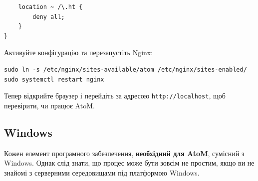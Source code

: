 \documentclass[14pt,a4paper]{article}
\begin{document}
\begin{large}
\begin{lstlisting}
    location ~ /\.ht {
        deny all;
    }
}
\end{lstlisting}

Активуйте конфігурацію та перезапустіть Nginx:

\begin{lstlisting}
sudo ln -s /etc/nginx/sites-available/atom /etc/nginx/sites-enabled/
sudo systemctl restart nginx
\end{lstlisting}


Тепер відкрийте браузер і перейдіть за адресою \texttt{http://localhost}, щоб перевірити, чи працює AtoM.

\subsection{Windows}
Кожен елемент програмного забезпечення, \textbf{необхідний для AtoM}, сумісний з Windows. Однак слід знати, що процес може бути зовсім не простим, якщо ви не знайомі з серверними середовищами під платформою Windows.
\end{large}
\end{document}
